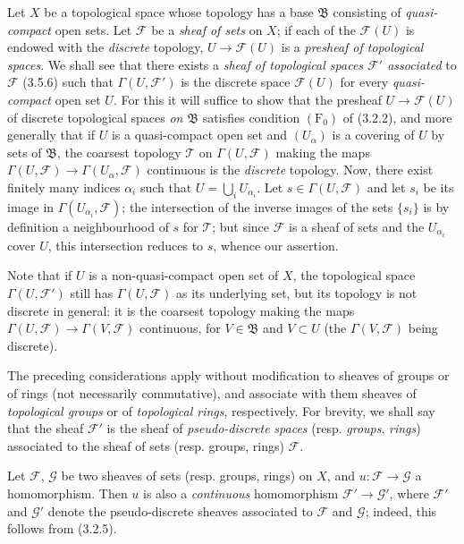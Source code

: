 \begin{env}[3.8.1]
\label{0.3.8.1}
Let $X$ be a topological space whose topology has a base
$\mathfrak{B}$ consisting of \emph{quasi-compact} open sets. Let
$\mathcal{F}$ be a \emph{sheaf of sets} on $X$; if each of the
$\mathcal{F}(U)$ is endowed with the \emph{discrete} topology,
$U\to\mathcal{F}(U)$ is a \emph{presheaf of topological spaces}.
We shall see that there exists a \emph{sheaf of topological spaces
$\mathcal{F}'$ associated} to $\mathcal{F}$ (3.5.6) such that
$\Gamma(U,\mathcal{F}')$ is the discrete space $\mathcal{F}(U)$ for every
\emph{quasi-compact} open set $U$. For this it will suffice to show that the
presheaf $U\to\mathcal{F}(U)$ of discrete topological spaces
\emph{on $\mathfrak{B}$} satisfies condition $(\mathrm{F}_0)$ of (3.2.2),
and more generally that if $U$ is a quasi-compact open set and
$(U_\alpha)$ is a covering of $U$ by sets of $\mathfrak{B}$,
the coarsest topology $\mathcal{T}$ on $\Gamma(U,\mathcal{F})$ making
the maps
$\Gamma(U,\mathcal{F})\to\Gamma(U_\alpha,\mathcal{F})$ continuous is the
\emph{discrete} topology. Now, there exist finitely many indices $\alpha_i$ such that
$U=\bigcup_i U_{\alpha_i}$. Let $s\in\Gamma(U,\mathcal{F})$ and let $s_i$ be its
image in $\Gamma(U_{\alpha_i},\mathcal{F})$; the intersection of the inverse
images of the sets $\{s_i\}$ is by definition a neighbourhood of $s$
for $\mathcal{T}$; but since $\mathcal{F}$ is a sheaf of sets and
the $U_{\alpha_i}$ cover $U$, this intersection reduces to $s$,
whence our assertion.

Note that if $U$ is a non-quasi-compact open set of $X$, the topological
space $\Gamma(U,\mathcal{F}')$ still has $\Gamma(U,\mathcal{F})$ as its
underlying set, but its topology is not discrete in general:
it is the coarsest topology making the maps
$\Gamma(U,\mathcal{F})\to\Gamma(V,\mathcal{F})$ continuous, for $V\in\mathfrak{B}$ and
$V\subset U$ (the $\Gamma(V,\mathcal{F})$ being discrete).

The preceding considerations apply without modification to sheaves
of groups or of rings (not necessarily commutative), and associate with them
sheaves of \emph{topological groups} or of \emph{topological rings},
respectively. For brevity, we shall say that the sheaf $\mathcal{F}'$ is the
sheaf of \emph{pseudo-discrete} \emph{spaces} (resp. \emph{groups},
\emph{rings}) associated to the sheaf of sets (resp. groups,
rings) $\mathcal{F}$.
\end{env}

\begin{env}[3.8.2]
\label{0.3.8.2}
Let $\mathcal{F}$, $\mathcal{G}$ be two sheaves of sets (resp. groups,
rings) on $X$, and $u:\mathcal{F}\to\mathcal{G}$ a homomorphism. Then $u$
is also a \emph{continuous} homomorphism $\mathcal{F}'\to\mathcal{G}'$, where
$\mathcal{F}'$ and $\mathcal{G}'$ denote the pseudo-discrete sheaves
associated to $\mathcal{F}$ and $\mathcal{G}$; indeed, this follows from
(3.2.5).
\end{env}

